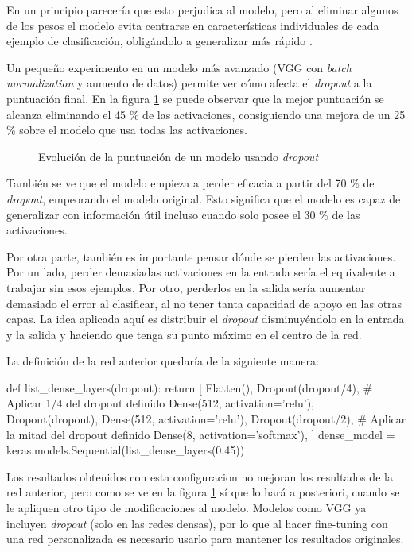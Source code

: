 En un principio parecería que esto perjudica al modelo, pero al eliminar algunos de los pesos el modelo evita centrarse en características individuales de cada ejemplo de clasificación, obligándolo a generalizar más rápido \parencite{dropout}.

Un pequeño experimento en un modelo más avanzado (VGG con \textit{batch normalization} y aumento de datos) permite ver cómo afecta el \textit{dropout} a la puntuación final. En la figura \ref{dropout} se puede observar que la mejor puntuación se alcanza eliminando el 45 \% de las activaciones, consiguiendo una mejora de un 25 \% sobre el modelo que usa todas las activaciones.

\begin{figure}
    \caption{Evolución de la puntuación de un modelo usando \textit{dropout}}
\label{dropout}
\end{figure}


También se ve que el modelo empieza a perder eficacia a partir del 70 \% de \textit{dropout}, empeorando el modelo original. Esto significa que el modelo es capaz de generalizar con información útil incluso cuando solo posee el 30 \% de las activaciones.

Por otra parte, también es importante pensar dónde se pierden las activaciones. Por un lado, perder demasiadas activaciones en la entrada sería el equivalente a trabajar sin esos ejemplos. Por otro, perderlos en la salida sería aumentar demasiado el error al clasificar, al no tener tanta capacidad de apoyo en las otras capas.  La idea aplicada aquí es distribuir el \textit{dropout} disminuyéndolo en la entrada y la salida y haciendo que tenga su punto máximo en el centro de la red.

La definición de la red anterior quedaría de la siguiente manera:

\begin{python}
def list_dense_layers(dropout):
    return [
        Flatten(),
        Dropout(dropout/4),  # Aplicar 1/4 del dropout definido 
        Dense(512, activation='relu'),
        Dropout(dropout),
        Dense(512, activation='relu'),
        Dropout(dropout/2),  # Aplicar la mitad del dropout definido
        Dense(8, activation='softmax'),
    ]
dense_model = keras.models.Sequential(list_dense_layers(0.45))
\end{python}

Los resultados obtenidos con esta configuracion no mejoran los resultados de la red anterior, pero como se ve en la figura \ref{dropout} sí que lo hará a posteriori, cuando se le apliquen otro tipo de modificaciones al modelo. Modelos como VGG ya incluyen \textit{dropout} (solo en las redes densas), por lo que al hacer fine-tuning con una red personalizada es necesario usarlo para mantener los resultados originales.

